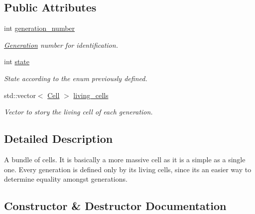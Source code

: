 \subsection*{Public Attributes}
\begin{DoxyCompactItemize}
\item 
\mbox{\label{structGeneration_a5ff02b52dbce4610d7e21eb4fdbe294c}} 
int \hyperlink{structGeneration_a5ff02b52dbce4610d7e21eb4fdbe294c}{generation\+\_\+number}
\begin{DoxyCompactList}\small\item\em \hyperlink{structGeneration}{Generation} number for identification. \end{DoxyCompactList}\item 
\mbox{\label{structGeneration_ad4d9077f76c31e0b51908047ce80a3ab}} 
int \hyperlink{structGeneration_ad4d9077f76c31e0b51908047ce80a3ab}{state}
\begin{DoxyCompactList}\small\item\em State according to the enum previously defined. \end{DoxyCompactList}\item 
\mbox{\label{structGeneration_afbdc1be1caea93849793004ed5eb1f5a}} 
std\+::vector$<$ \hyperlink{structCell}{Cell} $>$ \hyperlink{structGeneration_afbdc1be1caea93849793004ed5eb1f5a}{living\+\_\+cells}
\begin{DoxyCompactList}\small\item\em Vector to story the living cell of each generation. \end{DoxyCompactList}\end{DoxyCompactItemize}


\subsection{Detailed Description}
A bundle of cells. It is basically a more massive cell as it is a simple as a single one. Every generation is defined only by its living cells, since it\textquotesingle{}s an easier way to determine equality amongst generations. 

\subsection{Constructor \& Destructor Documentation}
\mbox{\label{structGeneration_a8e45e78fc1b9bcd513d58281a425baba}} 
